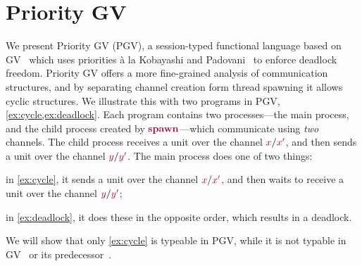 \documentclass[main.tex]{subfiles}
\begin{document}
\section{Priority GV}\label{sec:pgv}

We present Priority GV (PGV), a session-typed functional language based on GV~\cite{wadler15,lindleymorris15} which uses priorities \`{a} la Kobayashi and Padovani~\cite{kobayashi06,padovaninovara15} to enforce deadlock freedom.
Priority GV offers a more fine-grained analysis of communication structures, and by separating channel creation form thread spawning it allows cyclic structures. 
We illustrate this with two programs in PGV, \cref{ex:cycle,ex:deadlock}. Each program contains two processes---the main process, and the child process created by $\tm{\spawn}$---which communicate using \emph{two} channels. The child process receives a unit over the channel $\tm{x}/\tm{x'}$, and then sends a unit over the channel $\tm{y}/\tm{y'}$. The main process does one of two things:
\begin{enumerate*}[label=(\alph*)]
\item in \cref{ex:cycle}, it sends a unit over the channel $\tm{x}/\tm{x'}$, and then waits to receive a unit over the channel $\tm{y}/\tm{y'}$;
\item in \cref{ex:deadlock}, it does these in the opposite order, which results in a deadlock.
\end{enumerate*}
We will show that only \cref{ex:cycle} is typeable in PGV, while it is not typable in GV~\cite{wadler14} or its predecessor~\cite{gayvasconcelos10}. 
\end{document}
